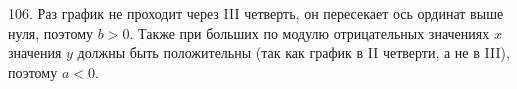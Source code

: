 106. Раз график не проходит через III четверть, он пересекает ось ординат выше нуля, поэтому $b>0.$ Также при больших по модулю отрицательных значениях $x$ значения $y$ должны быть положительны (так как график в II четверти, а не в III), поэтому $a<0.$\\
